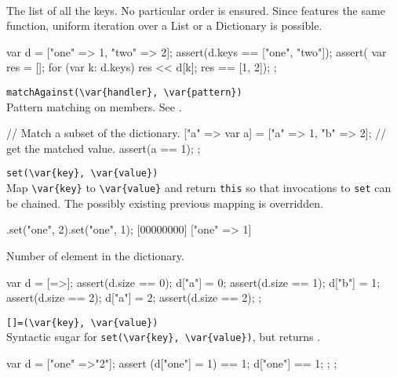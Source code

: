 \begin{urbiscriptapi}
\item[keys]\\
  The list of all the keys.  No particular order is ensured.  Since
   features the same function, uniform iteration over
  a List or a Dictionary is possible.
\begin{urbiscript}
{
  var d = ["one" => 1, "two" => 2];
  assert(d.keys == ["one", "two"]);
  assert({
           var res = [];
           for (var k: d.keys)
             res << d[k];
           res
         }
         == [1, 2]);
};
\end{urbiscript}

\item \lstinline|matchAgainst(\var{handler}, \var{pattern})|\\
  Pattern matching on members.  See .

\begin{urbiscript}
{
  // Match a subset of the dictionary.
  ["a" => var a] = ["a" => 1, "b" => 2];
  // get the matched value.
  assert(a == 1);
};
\end{urbiscript}

\item \lstinline|set(\var{key}, \var{value})|\\
  Map \lstinline|\var{key}| to \lstinline|\var{value}| and return
  \lstinline|this| so that invocations to \lstinline|set| can be
  chained.  The possibly existing previous mapping is overridden.

\begin{urbiscript}
[=>].set("one", 2).set("one", 1);
[00000000] ["one" => 1]
\end{urbiscript}

\item[size]
  Number of element in the dictionary.

\begin{urbiscript}
{
  var d = [=>];
  assert(d.size == 0);
  d["a"] = 0;
  assert(d.size == 1);
  d["b"] = 1;
  assert(d.size == 2);
  d["a"] = 2;
  assert(d.size == 2);
};
\end{urbiscript}

\item \lstinline|[]=(\var{key}, \var{value})|\\
  Syntactic sugar for \lstinline|set(\var{key}, \var{value})|, but
  returns .

\begin{urbiscript}
{
  var d = ["one" =>"2"];
  assert
  {
    (d["one"] = 1) == 1;
    d["one"] == 1;
  };
};
\end{urbiscript}


\end{urbiscriptapi}
